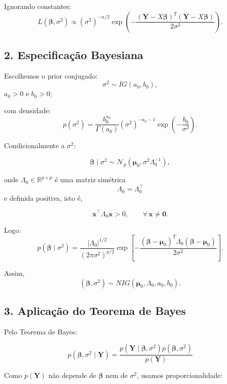 \documentclass[12pt, a4paper]{article}
\begin{document}
Ignorando constantes:
\[ L(\boldsymbol{\beta},\sigma^2) \propto (\sigma^2)^{-n/2} \exp \left( -\frac{(\mathbf{Y}-X\boldsymbol{\beta})^T (\mathbf{Y}-X\boldsymbol{\beta})}{2\sigma^2} \right). \]

\vspace{0.4cm}

\subsection*{2. Especificação Bayesiana}

Escolhemos o prior conjugado:
\[ \sigma^2 \sim IG(a_0,b_0), \] $a_0>0$ e $b_0>0$;

com densidade:
\[ p(\sigma^2) = \frac{b_0^{a_0}}{\Gamma(a_0)} (\sigma^2)^{-a_0-1} \exp\left( -\frac{b_0}{\sigma^2} \right). \]

Condicionalmente a $\sigma^2$:

\[
\boldsymbol{\beta}\mid\sigma^2
\sim
\mathcal{N}_p
\left(
\boldsymbol{\mu}_0,
\sigma^2\Lambda_0^{-1}
\right),
\]

onde $\Lambda_0\in\mathbb{R}^{p\times p}$ é uma matriz simétrica
\[
\Lambda_0=\Lambda_0^{\top}
\]
e definida positiva, isto é,

\[
\mathbf{x}^{\top}\Lambda_0\mathbf{x}>0,
\qquad
\forall\,\mathbf{x}\neq\mathbf{0}.
\]

Logo:
\[ p(\boldsymbol{\beta}\mid\sigma^2) = \frac{|\Lambda_0|^{1/2}}{(2\pi\sigma^2)^{p/2}} \exp \left[ -\frac{(\boldsymbol{\beta}-\boldsymbol{\mu}_0)^T \Lambda_0 (\boldsymbol{\beta}-\boldsymbol{\mu}_0)}{2\sigma^2} \right]. \]

Assim,
\[ (\boldsymbol{\beta},\sigma^2) \sim NIG(\boldsymbol{\mu}_0,\Lambda_0,a_0,b_0). \]

\vspace{0.4cm}

\subsection*{3. Aplicação do Teorema de Bayes}

Pelo Teorema de Bayes:

\[
p(\boldsymbol{\beta},\sigma^2\mid\mathbf Y)
=
\frac{
p(\mathbf Y\mid\boldsymbol{\beta},\sigma^2)
p(\boldsymbol{\beta},\sigma^2)
}{
p(\mathbf Y)
}
\]

Como \(p(\mathbf Y)\) não depende de
\(\boldsymbol{\beta}\) nem de \(\sigma^2\), usamos proporcionalidade:
\end{document}

